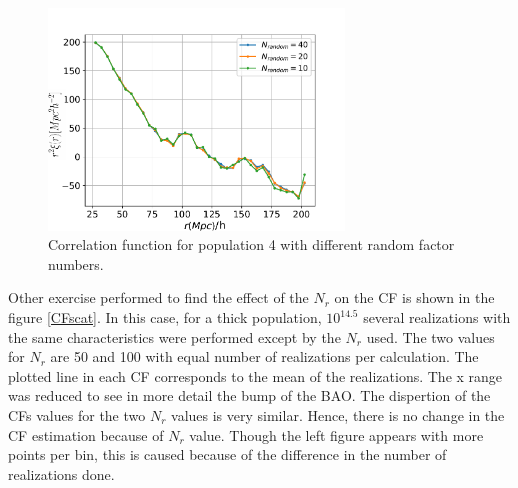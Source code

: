 \begin{figure}[htbp]
       \centering
               \includegraphics[width=0.7\textwidth]{Images/chapter4/CF_1e14_Nrandom.pdf}
       \caption{\small Correlation function for population 4 with different random factor
       numbers.}
       \label{nrandom}
 \end{figure}


Other exercise performed to find the effect of the $N_r$ on the CF is shown
in the figure \ref{CFscat}. In this case, for a thick population, $10^{14.5}$
several realizations with the same characteristics were performed except
by the $N_r$ used. The two values for $N_r$ are 50 and 100 with equal number
of realizations per calculation. The plotted line in each CF corresponds to the 
mean of the realizations. The x range was reduced to see in more detail the
bump of the BAO. The dispertion of the CFs values for the two $N_r$ values
is very similar. Hence, there is no change in the CF estimation because of 
$N_r$ value.
Though the left figure appears with more points per bin, this is caused
because of the difference in the number of realizations done. 

